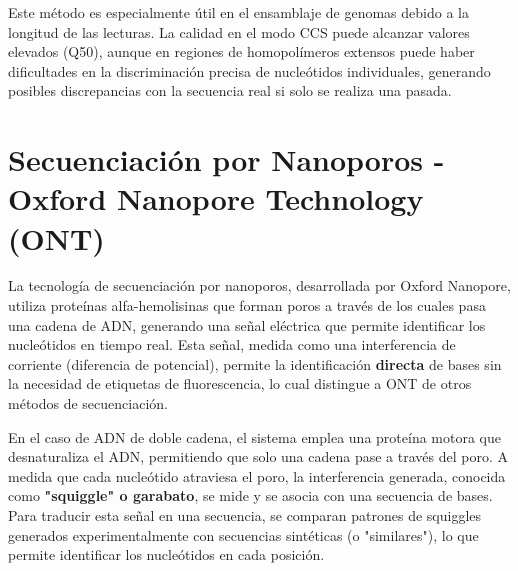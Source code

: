 Este método es especialmente útil en el ensamblaje de genomas debido a la longitud de las lecturas. La calidad en el modo CCS puede alcanzar valores elevados (Q50), aunque en regiones de homopolímeros extensos puede haber dificultades en la discriminación precisa de nucleótidos individuales, generando posibles discrepancias con la secuencia real si solo se realiza una pasada. 

\section{Secuenciación por Nanoporos - Oxford Nanopore Technology (ONT)}
La tecnología de secuenciación por nanoporos, desarrollada por Oxford Nanopore, utiliza proteínas alfa-hemolisinas que forman poros a través de los cuales pasa una cadena de ADN, generando una señal eléctrica que permite identificar los nucleótidos en tiempo real. Esta señal, medida como una interferencia de corriente (diferencia de potencial), permite la identificación \textbf{directa} de bases sin la necesidad de etiquetas de fluorescencia, lo cual distingue a ONT de otros métodos de secuenciación.

En el caso de ADN de doble cadena, el sistema emplea una proteína motora que desnaturaliza el ADN, permitiendo que solo una cadena pase a través del poro. A medida que cada nucleótido atraviesa el poro, la interferencia generada, conocida como \textbf{"squiggle" o garabato}, se mide y se asocia con una secuencia de bases. Para traducir esta señal en una secuencia, se comparan patrones de squiggles generados experimentalmente con secuencias sintéticas (o "similares"), lo que permite identificar los nucleótidos en cada posición.

